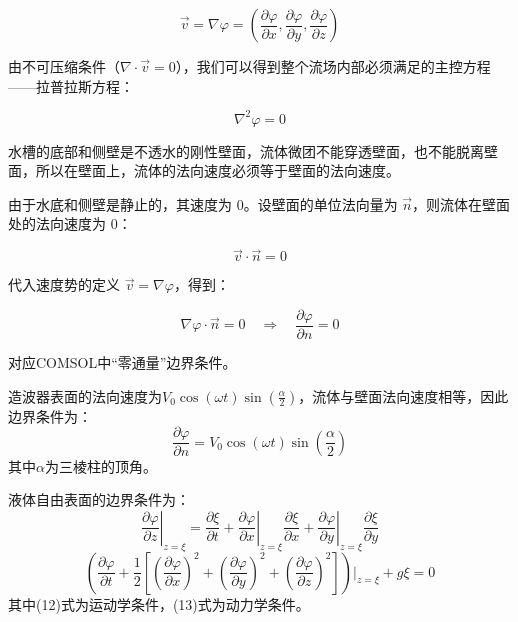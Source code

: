 \documentclass[11pt,a4paper]{ctexart}
\begin{document}
\begin{equation}
\vec{v} = \nabla \varphi = (\frac{\partial \varphi}{\partial x}, \frac{\partial \varphi}{\partial y}, \frac{\partial \varphi}{\partial z})
\end{equation}

由不可压缩条件（$\nabla \cdot \vec{v} = 0$），我们可以得到整个流场内部必须满足的主控方程——拉普拉斯方程\cite{Liang2009}：

\begin{equation}
\nabla^2 \varphi = 0
\end{equation}

水槽的底部和侧壁是不透水的刚性壁面，流体微团不能穿透壁面，也不能脱离壁面，所以在壁面上，流体的法向速度必须等于壁面的法向速度。

由于水底和侧壁是静止的，其速度为 0。设壁面的单位法向量为 $\vec{n}$，则流体在壁面处的法向速度为 0：

\begin{equation}
\vec{v} \cdot \vec{n} = 0
\end{equation}

代入速度势的定义 $\vec{v} = \nabla \varphi$，得到：

\begin{equation}
\nabla \varphi \cdot \vec{n} = 0 \quad \Rightarrow \quad \frac{\partial \varphi}{\partial n} = 0
\end{equation}

对应COMSOL中“零通量”边界条件。

造波器表面的法向速度为$V_0 \cos(\omega t)\sin(\frac{\alpha}{2})$，流体与壁面法向速度相等，因此边界条件为：
\begin{equation}
    \frac{\partial \varphi}{\partial n} = V_0 \cos(\omega t)\sin(\frac{\alpha}{2})
\end{equation}
其中$\alpha$为三棱柱的顶角。

液体自由表面的边界条件为：
\begin{equation}
    \left. \frac{\partial \varphi}{\partial z} \right|_{z=\xi} = \frac{\partial \xi}{\partial t} + \left. \frac{\partial \varphi}{\partial x} \right|_{z=\xi} \frac{\partial \xi}{\partial x} + \left. \frac{\partial \varphi}{\partial y} \right|_{z=\xi} \frac{\partial \xi}{\partial y}
\end{equation}
\begin{equation}
    \left( \frac{\partial \varphi}{\partial t} + \frac{1}{2} \left[ \left( \frac{\partial \varphi}{\partial x} \right)^2 + \left( \frac{\partial \varphi}{\partial y} \right)^2 + \left( \frac{\partial \varphi}{\partial z} \right)^{2} \right] \right) \Bigg|_{z=\xi} + g\xi = 0
\end{equation}
其中(12)式为运动学条件，(13)式为动力学条件\cite{Liang2009}。
\end{document}
